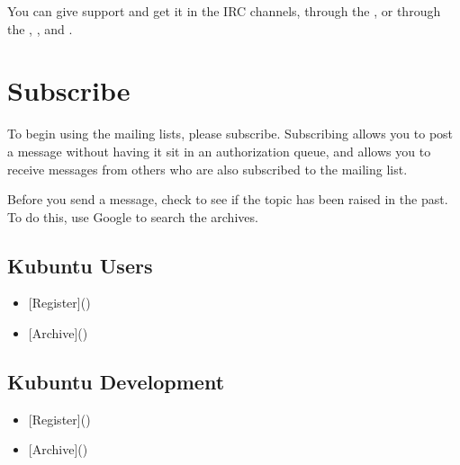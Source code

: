 \documentclass[letterpaper,10pt,english]{sphinxmanual}
\begin{document}
\sphinxAtStartPar
You can give support and get it in the IRC channels, through the , or through the , , and .


\section{Subscribe}
\label{\detokenize{docs/contribute:subscribe}}
\sphinxAtStartPar
To begin using the mailing lists, please subscribe. Subscribing allows you to post a message without having it sit in an authorization queue, and allows you to receive messages from others who are also subscribed to the mailing list.

\sphinxAtStartPar
Before you send a message, check to see if the topic has been raised in the past. To do this, use Google to search the archives.


\subsection{Kubuntu Users}
\label{\detokenize{docs/contribute:kubuntu-users}}\begin{itemize}
\item {} 
\sphinxAtStartPar
{[}Register{]}()

\item {} 
\sphinxAtStartPar
{[}Archive{]}()

\end{itemize}


\subsection{Kubuntu Development}
\label{\detokenize{docs/contribute:kubuntu-development}}\begin{itemize}
\item {} 
\sphinxAtStartPar
{[}Register{]}()

\item {} 
\sphinxAtStartPar
{[}Archive{]}()

\end{itemize}
\end{document}
